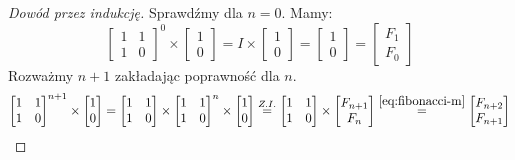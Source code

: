 \begin{proof}[Dowód przez indukcję]
  Sprawdźmy dla $n = 0$. Mamy:
  \begin{equation*}
    \begin{bmatrix}1 & 1 \\ 1 & 0\end{bmatrix}^0
    \times
    \begin{bmatrix}1 \\ 0\end{bmatrix}
    =
    I
    \times
    \begin{bmatrix}1 \\ 0\end{bmatrix}
    =
    \begin{bmatrix}1 \\ 0\end{bmatrix}
    =
    \begin{bmatrix}F_1 \\ F_0\end{bmatrix}
  \end{equation*}
  Rozważmy $n + 1$ zakładając poprawność dla $n$.
  \begin{equation*}
    \begin{bmatrix}
      1 & 1 \\
      1 & 0
    \end{bmatrix}^{n + 1}
    \times
    \begin{bmatrix}1 \\ 0\end{bmatrix}
    =
    \begin{bmatrix}
      1 & 1 \\
      1 & 0
    \end{bmatrix}
    \times
    \begin{bmatrix}
      1 & 1 \\
      1 & 0
    \end{bmatrix}^{n}
    \times
    \begin{bmatrix}1 \\ 0\end{bmatrix}
    \stackrel{Z.I.}{=}
    \begin{bmatrix}
      1 & 1 \\
      1 & 0
    \end{bmatrix}
    \times
    \begin{bmatrix}F_{n+1} \\ F_{n}\end{bmatrix}
    \stackrel{\ref{eq:fibonacci-m}}{=}
    \begin{bmatrix}F_{n + 2} \\ F_{n + 1}\end{bmatrix}
  \end{equation*}
\end{proof}

